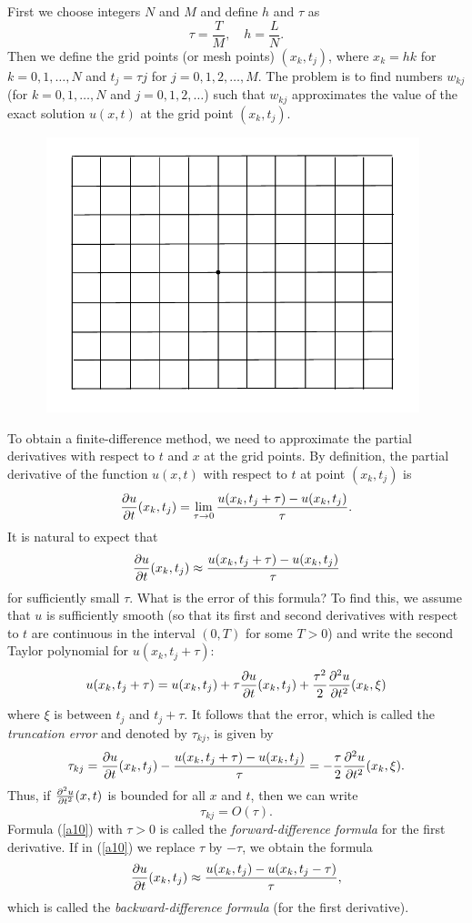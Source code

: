 First we choose integers $N$ and $M$ and define
$h$ and $\tau$ as
\[
\tau=\frac{T}{M}, \quad h=\frac{L}{N}.
\]
Then we define the grid points (or mesh points)
$(x_{k}, t_{j})$, where $x_{k}=hk$ for $k=0,1,\dots,N$ and
$t_{j}=\tau j$ for $j=0,1,2,\dots,M$. The problem is to find numbers $w_{kj}$
(for $k=0,1,\dots,N$ and $j=0,1,2,\dots$) such that $w_{kj}$ approximates the value of the exact solution
$u(x,t)$ at the grid point $(x_{k}, t_{j})$.
\begin{figure}[h]
\centering
\includegraphics[width=11cm,height=8cm]{basic_grid2.pdf}
\caption{}
\end{figure}
 
To obtain a finite-difference method, we need to approximate the partial derivatives
with respect to $t$ and $x$ at the grid points. By definition,
the partial derivative of the function $u(x,t)$ with respect to
$t$ at point $(x_k,t_j)$ is
\[
\frac{{\partial} u}{{\partial} t}(x_k,t_j)=\lim_{\tau\to 0}\frac{u(x_k,t_j+\tau)-u(x_k,t_j)}{\tau}.
\]
It is natural to expect that
\begin{equation}
\frac{{\partial} u}{{\partial} t}(x_k,t_j)\approx \frac{u(x_k,t_j+\tau)-u(x_k,t_j)}{\tau}
\label{a10}
\end{equation}
for sufficiently small $\tau$. What is the error of this formula?
To find this, we assume that $u$ is sufficiently smooth (so that its first and second
derivatives with respect to $t$ are continuous in the interval $(0,T)$ for some $T>0$)
and write the second Taylor polynomial for $u(x_k,t_j+\tau)$:
\[
u(x_k,t_j+\tau)=u(x_k,t_j)+\tau \frac{{\partial} u}{{\partial} t}(x_k,t_j)+
\frac{\tau^2}{2}\frac{{\partial}^2 u}{{\partial} t^2}(x_k,\xi)
\]
where $\xi$ is between $t_j$ and $t_j+\tau$. It follows that the error,
which is called the {\em truncation error } and denoted by $\tau_{kj}$,
is given by
\[
\tau_{kj}=\frac{{\partial} u}{{\partial} t}(x_k,t_j)-\frac{u(x_k,t_j+\tau)-u(x_k,t_j)}{\tau}=
-\frac{\tau}{2}\frac{{\partial}^2 u}{{\partial} t^2}(x_k,\xi).
\]
Thus, if $\frac{{\partial}^2 u}{{\partial} t^2}(x,t)$ is bounded for all $x$ and $t$, then
we can write
\[
\tau_{kj}=O(\tau).
\]
Formula (\ref{a10}) with $\tau>0$ is called the {\it forward-difference formula}
for the first derivative.
If in (\ref{a10}) we replace $\tau$ by $-\tau$, we obtain the formula
\begin{equation}
\frac{{\partial} u}{{\partial} t}(x_k,t_j)\approx \frac{u(x_k,t_j)-u(x_k,t_j-\tau)}{\tau},
\label{a11}
\end{equation}
which is called the {\it backward-difference formula} (for the first derivative).
 
